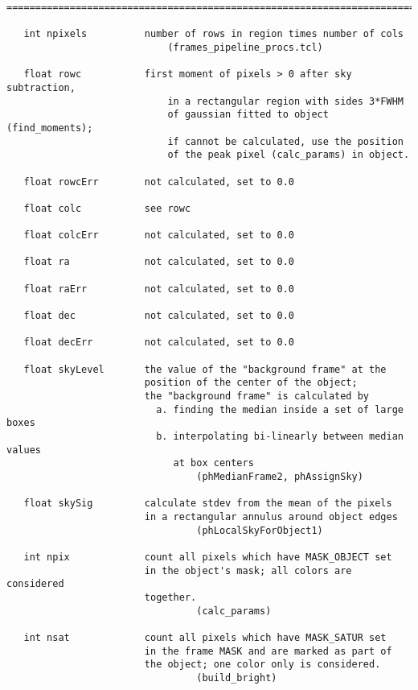 \begin{verbatim}
========================================================================

   int npixels          number of rows in region times number of cols
                            (frames_pipeline_procs.tcl)

   float rowc           first moment of pixels > 0 after sky subtraction,
                            in a rectangular region with sides 3*FWHM
                            of gaussian fitted to object (find_moments);
                            if cannot be calculated, use the position
                            of the peak pixel (calc_params) in object.

   float rowcErr        not calculated, set to 0.0

   float colc           see rowc
                            
   float colcErr        not calculated, set to 0.0

   float ra             not calculated, set to 0.0

   float raErr          not calculated, set to 0.0

   float dec            not calculated, set to 0.0

   float decErr         not calculated, set to 0.0

   float skyLevel       the value of the "background frame" at the 
                        position of the center of the object;
                        the "background frame" is calculated by
                          a. finding the median inside a set of large boxes
                          b. interpolating bi-linearly between median values
                             at box centers
                                 (phMedianFrame2, phAssignSky)

   float skySig         calculate stdev from the mean of the pixels
                        in a rectangular annulus around object edges
                                 (phLocalSkyForObject1)

   int npix             count all pixels which have MASK_OBJECT set
                        in the object's mask; all colors are considered
                        together.
                                 (calc_params)

   int nsat             count all pixels which have MASK_SATUR set
                        in the frame MASK and are marked as part of 
                        the object; one color only is considered.
                                 (build_bright)


\end{verbatim}
